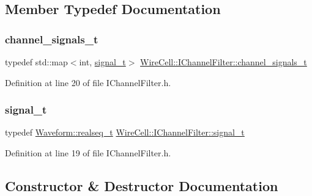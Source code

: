 \subsection{Member Typedef Documentation}
\mbox{\label{class_wire_cell_1_1_i_channel_filter_a44de35ce47701d84cd45393c6bcd5e2f}} 
\subsubsection{\texorpdfstring{channel\+\_\+signals\+\_\+t}{channel\_signals\_t}}
{\footnotesize\ttfamily typedef std\+::map$<$int, \hyperlink{class_wire_cell_1_1_i_channel_filter_a434ed96cc4b805fa0eeec14f9f8d85e9}{signal\+\_\+t}$>$ \hyperlink{class_wire_cell_1_1_i_channel_filter_a44de35ce47701d84cd45393c6bcd5e2f}{Wire\+Cell\+::\+I\+Channel\+Filter\+::channel\+\_\+signals\+\_\+t}}



Definition at line 20 of file I\+Channel\+Filter.\+h.

\mbox{\label{class_wire_cell_1_1_i_channel_filter_a434ed96cc4b805fa0eeec14f9f8d85e9}} 
\subsubsection{\texorpdfstring{signal\+\_\+t}{signal\_t}}
{\footnotesize\ttfamily typedef \hyperlink{namespace_wire_cell_1_1_waveform_a479175e541c8545e87cd8063b74b6956}{Waveform\+::realseq\+\_\+t} \hyperlink{class_wire_cell_1_1_i_channel_filter_a434ed96cc4b805fa0eeec14f9f8d85e9}{Wire\+Cell\+::\+I\+Channel\+Filter\+::signal\+\_\+t}}



Definition at line 19 of file I\+Channel\+Filter.\+h.



\subsection{Constructor \& Destructor Documentation}
\mbox{\label{class_wire_cell_1_1_i_channel_filter_a25e462786015d136cb57367c945524cb}} 
